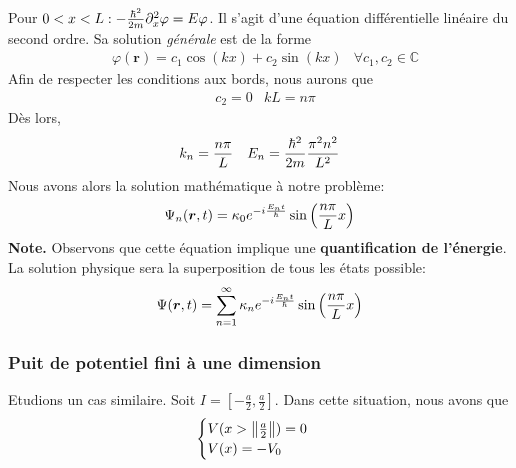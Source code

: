 \documentclass[../notesdecours]{subfiles}
\begin{document}
Pour $0 < x < L : - \frac{\hbar^2}{2m} \partial_x^2 \varphi = E \varphi$. Il s'agit d'une équation différentielle linéaire du second ordre. Sa solution \textit{générale} est de la forme
\begin{align}
&\varphi(\bm{r}) = c_1 \cos \left(kx\right) + c_2\sin \left( kx \right)									&\forall c_1,c_2 \in \mathbb{C}
\label{Kikoo}
\end{align}
Afin de respecter les conditions aux bords, nous aurons que
\begin{align}
&c_2 = 0 &kL = n\pi
\end{align}
Dès lors,
\begin{align}
&k_n = \frac{n\pi}{L} &E_n = \frac{\hbar^2}{2m} \frac{\pi^2n^2}{L^2}
\end{align}
Nous avons alors la solution mathématique à notre problème:
\begin{equation}
\Psi_n (\bm{r},t) = \kappa_0 e^{-i \frac{E_nt}{\hbar}}\sin \left( \frac{n\pi}{L}x \right)
\end{equation}
\textbf{Note.} Observons que cette équation implique une \textbf{quantification de l'énergie}. La solution physique sera la superposition de tous les états possible:
\begin{equation}
\Psi (\bm{r},t) = \sum_{n = 1}^\infty \kappa_n e^{-i \frac{E_nt}{\hbar}}\sin \left( \frac{n\pi}{L}x \right)
\end{equation}

\subsubsection{Puit de potentiel fini à une dimension}
Etudions un cas similaire. Soit $I = \left[-\frac{a}{2},\frac{a}{2}\right]$. Dans cette situation, nous avons que 
\begin{equation}
\begin{cases} 
V(x > \norm{\frac{a}{2}}) = 0 \\ 
V(x) = -V_0\\
\end{cases}
\end{equation}
\end{document}
